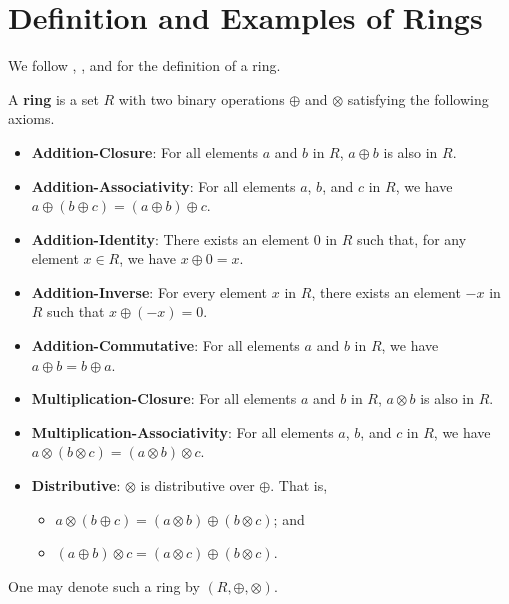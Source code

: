 \section{Definition and Examples of Rings}
We follow \cite[p.~223]{dummit_foote_2004}, \cite[p.~115, Definition 1.1]{hungerford_1980}, and \cite{proofwiki_ringdefinition} for the definition of a ring.
\begin{definition}
    A \textbf{ring} is a set $R$ with two binary operations $\oplus$ and $\otimes$ satisfying the following axioms.
    \begin{itemize}
        \item \textbf{Addition-Closure}: For all elements $a$ and $b$ in $R$, $a \oplus b$ is also in $R$.
        \item \textbf{Addition-Associativity}: For all elements $a$, $b$, and $c$ in $R$, we have $a \oplus (b \oplus c) = (a \oplus b) \oplus c$.
        \item \textbf{Addition-Identity}: There exists an element 0 in $R$ such that, for any element $x \in R$, we have $x \oplus 0 = x$.
        \item \textbf{Addition-Inverse}: For every element $x$ in $R$, there exists an element $-x$ in $R$ such that $x \oplus (-x) = 0$.
        \item \textbf{Addition-Commutative}: For all elements $a$ and $b$ in $R$, we have $a \oplus b = b \oplus a$.
        \item \textbf{Multiplication-Closure}: For all elements $a$ and $b$ in $R$, $a \otimes b$ is also in $R$.
        \item \textbf{Multiplication-Associativity}: For all elements $a$, $b$, and $c$ in $R$, we have $a \otimes (b \otimes c) = (a \otimes b) \otimes c$.
        \item \textbf{Distributive}: $\otimes$ is distributive over $\oplus$. That is,
        \begin{itemize}
            \item $a \otimes (b \oplus c) = (a \otimes b) \oplus (b \otimes c)$; and
            \item $(a \oplus b) \otimes c = (a \otimes c) \oplus (b \otimes c)$.
        \end{itemize}
    \end{itemize}
    One may denote such a ring by $(R, \oplus, \otimes)$.
\end{definition}
